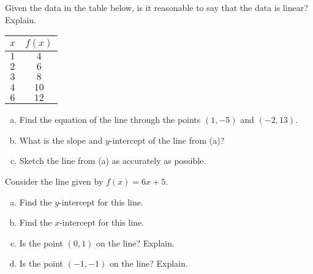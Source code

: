 \documentclass[11pt,letterpaper]{article}
\begin{document}
\vfill
\newpage



 Given the data in the table below, is it reasonable to say that the data is linear? Explain. 
	\begin{table}[!ht]
	\centering
	\begin{tabular}{c|c}
	$x$ & $f(x)$ \\ \hline
	$1$ & $4$ \\
	$2$ & $6$ \\
	$3$ & $8$ \\
	$4$ & $10$ \\
	$6$ & $12$ 
	\end{tabular}
	\end{table}



\newpage



\begin{enumerate}[(a)]
\item Find the equation of the line through the points $(1, -5)$ and $(-2, 13)$. \vfill
\item What is the slope and $y$-intercept of the line from (a)? \vfill
\item Sketch the line from (a) as accurately as possible. \vfill
\end{enumerate}



\newpage



 Consider the line given by $f(x)= 6x + 5$.
        \begin{enumerate}[(a)]
        \item Find the $y$-intercept for this line. \vfill
        \item Find the $x$-intercept for this line. \vfill
        \item Is the point $(0, 1)$ on the line? Explain. \vfill
        \item Is the point $(-1, -1)$ on the line? Explain. \vfill
        \end{enumerate}
\end{document}
